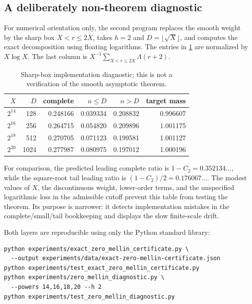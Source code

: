 \subsection{A deliberately non-theorem diagnostic}

For numerical orientation only, the second program replaces the smooth
weight by the sharp box $X<r\leq2X$, takes $h=2$ and
$D=\lfloor\sqrt X\rfloor$, and computes the exact decomposition using
floating logarithms.  The entries in \cref{tab:sharp-box-diagnostic} are
normalized by $X\log X$.  The last column is
$X^{-1}\sum_{X<r\leq2X}\Lambda(r+2)$.

\begin{table}[ht]
\centering
\caption{Sharp-box implementation diagnostic; this is not a verification
of the smooth asymptotic theorem.}
\label{tab:sharp-box-diagnostic}
\begin{tabular}{rrrrrr}
\toprule
$X$ & $D$ & complete & $n\leq D$ & $n>D$ & target mass \\
\midrule
$2^{14}$ & 128  & 0.248166 & 0.039334 & 0.208832 & 0.996607 \\
$2^{16}$ & 256  & 0.264715 & 0.054820 & 0.209896 & 1.001175 \\
$2^{18}$ & 512  & 0.270705 & 0.071123 & 0.199581 & 1.001127 \\
$2^{20}$ & 1024 & 0.277987 & 0.080975 & 0.197012 & 1.000196 \\
\bottomrule
\end{tabular}
\end{table}

For comparison, the predicted leading complete ratio is
$1-C_2=0.352134\ldots$, while the square-root tail leading ratio is
$(1-C_2)/2=0.176067\ldots$.  The modest values of $X$, the discontinuous
weight, lower-order terms, and the unspecified logarithmic loss in the
admissible cutoff prevent this table from testing the theorem.  Its purpose
is narrower: it detects implementation mistakes in the complete/small/tail
bookkeeping and displays the slow finite-scale drift.

Both layers are reproducible using only the Python standard library:
\begin{verbatim}
python experiments/exact_zero_mellin_certificate.py \
  --output experiments/data/exact-zero-mellin-certificate.json
python experiments/test_exact_zero_mellin_certificate.py
python experiments/zero_mellin_diagnostic.py \
  --powers 14,16,18,20 --h 2
python experiments/test_zero_mellin_diagnostic.py
\end{verbatim}

